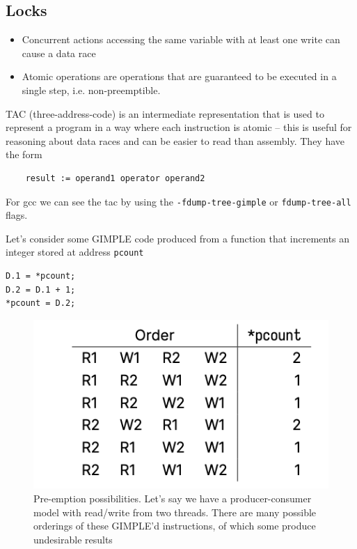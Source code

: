 \documentclass[../notes.tex]{subfiles}
\begin{document}
\subsection{Locks}

\begin{itemize}
    \item Concurrent actions accessing the same variable with at least one write can cause a data race
    \item Atomic operations are operations that are guaranteed to be executed in a single step, i.e. non-preemptible.
\end{itemize}

\begin{definition}
    TAC (three-address-code) is an intermediate representation that is used to represent a program in a way where each instruction is atomic -- this is useful for reasoning about data races and can be easier to read than assembly.
    They have the form

    \begin{listing}[H]
    \begin{verbatim}
    result := operand1 operator operand2
    \end{verbatim}
    \end{listing}


    For gcc we can see the tac by using the \texttt{-fdump-tree-gimple} or \texttt{fdump-tree-all} flags.
\end{definition}

Let's consider some GIMPLE code produced from a function that increments an integer stored at address \texttt{pcount}

\begin{listing}[H]
\begin{verbatim}
D.1 = *pcount;
D.2 = D.1 + 1;
*pcount = D.2;
\end{verbatim}
\end{listing}


\begin{figure}[H]
    \centering
    \includegraphics[width=0.8\linewidth]{img/image_2023-03-08-13-21-55.png}
    \caption{Pre-emption possibilities. Let's say we have a producer-consumer model with read/write from two threads. There are many possible orderings of these GIMPLE'd instructions, of which some produce undesirable results}
\end{figure}
\end{document}

